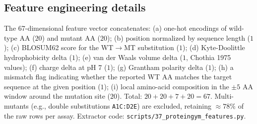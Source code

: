 \subsection{Feature engineering details}
\label{app:proteingym:features}

The 67-dimensional feature vector concatenates: (a) one-hot encodings of wild-type AA ($20$) and mutant AA ($20$); (b) position normalized by sequence length ($1$); (c) BLOSUM62 score for the WT$\to$MT substitution ($1$); (d) Kyte-Doolittle hydrophobicity delta ($1$); (e) van der Waals volume delta ($1$, Chothia 1975 values); (f) charge delta at pH 7 ($1$); (g) Grantham polarity delta ($1$); (h) a mismatch flag indicating whether the reported WT AA matches the target sequence at the given position ($1$); (i) local amino-acid composition in the $\pm 5$ AA window around the mutation site ($20$). Total: $20 + 20 + 7 + 20 = 67$. Multi-mutants (e.g., double substitutions \texttt{A1C:D2E}) are excluded, retaining $\approx 78\%$ of the raw rows per assay. Extractor code: \texttt{scripts/37\_proteingym\_features.py}.
